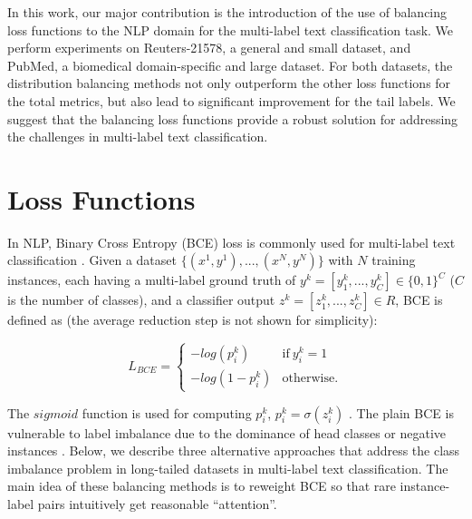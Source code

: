 \documentclass[11pt]{article}
\begin{document}
In this work, our major contribution is the introduction of the use of balancing loss functions to the NLP domain for the multi-label text classification task. We perform experiments on Reuters-21578, a general and small dataset, and PubMed, a biomedical domain-specific and large dataset. For both datasets, the distribution balancing methods not only outperform the other loss functions for the total metrics, but also lead to significant improvement for the tail labels. We suggest that the balancing loss functions provide a robust solution for addressing the challenges in multi-label text classification. 




































\section{Loss Functions}
\label{section:loss_functions}

In NLP, Binary Cross Entropy (BCE) loss is commonly used for  multi-label text classification \citep{Bengio-review}. Given a dataset $\{(x^1,y^1),..., (x^N,y^N)\}$ with $N$ training instances, each having a multi-label ground truth of $y^k = [y_{1}^{k},...,y_{C}^{k}] \in \{0,1\}^C$ ($C$ is the number of classes), and a classifier output $z^k = [z_{1}^{k},...,z_{C}^{k}] \in R$, BCE is defined as (the average reduction step is not shown for simplicity):


\small
  \begin{equation}
    L_{BCE}=
    \begin{cases}
      -log(p_{i}^{k}) & \text{if}\ y_{i}^{k}=1 \\
      -log(1-p_{i}^{k}) & \text{otherwise.}
    \end{cases}
  \end{equation}
\normalsize

The $sigmoid$ function is used for computing $p_{i}^{k}$,  $p_{i}^{k} = \sigma(z_{i}^{k})$ . The plain BCE is vulnerable to label imbalance due to the dominance of head classes or negative instances   \citep{BCE_CV}. Below, we describe three alternative approaches that address the class imbalance problem in long-tailed datasets in multi-label text classification. The main idea of these balancing methods is to reweight BCE so that rare instance-label pairs intuitively get reasonable “attention”.
\end{document}
